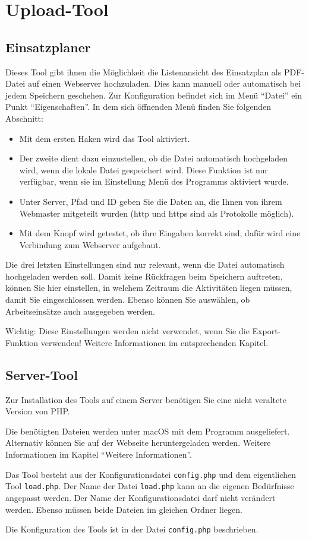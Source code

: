 \chapter{Upload-Tool}
\section{Einsatzplaner}
Dieses Tool gibt ihnen die Möglichkeit die Listenansicht des Einsatzplan als PDF-Datei auf einen Webserver hochzuladen.
Dies kann manuell oder automatisch bei jedem Speichern geschehen.
Zur Konfiguration befindet sich im Menü ``Datei'' ein Punkt ``Eigenschaften''.
In dem sich öffnenden Menü finden Sie folgenden Abschnitt:

\begin{itemize}
  \item
  Mit dem ersten Haken wird das Tool aktiviert.
  \item
  Der zweite dient dazu einzustellen, ob die Datei automatisch hochgeladen wird, wenn die lokale Datei gespeichert wird.
  Diese Funktion ist nur verfügbar, wenn sie im Einstellung Menü des Programms aktiviert wurde.
  \item
  Unter Server, Pfad und ID geben Sie die Daten an, die Ihnen von ihrem Webmaster mitgeteilt wurden (http und https sind als Protokolle möglich).
  \item
  Mit dem Knopf wird getestet, ob ihre Eingaben korrekt sind, dafür wird eine Verbindung zum Webserver aufgebaut.
\end{itemize}

Die drei letzten Einstellungen sind nur relevant, wenn die Datei automatisch hochgeladen werden soll.
Damit keine Rückfragen beim Speichern auftreten, können Sie hier einstellen, in welchem Zeitraum die Aktivitäten liegen müssen, damit Sie eingeschlossen werden.
Ebenso können Sie auswählen, ob Arbeitseinsätze auch ausgegeben werden.

Wichtig:
Diese Einstellungen werden nicht verwendet, wenn Sie die Export-Funktion verwenden!
Weitere Informationen im entsprechenden Kapitel.



\section{Server-Tool}
Zur Installation des Tools auf einem Server benötigen Sie eine nicht veraltete Version von PHP.

Die benötigten Dateien werden unter macOS mit dem Programm ausgeliefert.
Alternativ können Sie auf der Webseite heruntergeladen werden.
Weitere Informationen im Kapitel ``Weitere Informationen''.

Das Tool besteht aus der Konfigurationsdatei \texttt{config.php} und dem eigentlichen Tool \texttt{load.php}.
Der Name der Datei \texttt{load.php} kann an die eigenen Bedürfnisse angepasst werden.
Der Name der Konfigurationsdatei darf nicht verändert werden.
Ebenso müssen beide Dateien im gleichen Ordner liegen.

Die Konfiguration des Tools ist in der Datei \texttt{config.php} beschrieben.
